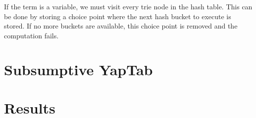 If the term is a variable, we must visit every trie node in the hash table. This can be done
by storing a choice point where the next hash bucket to execute is stored. If no more
buckets are available, this choice point is removed and the computation fails.

\section{Subsumptive YapTab}

\section{Results}

